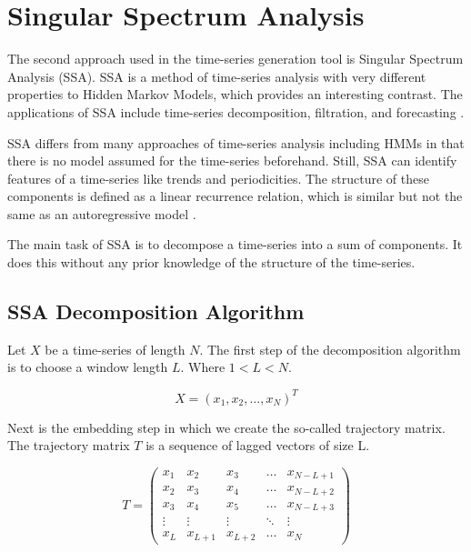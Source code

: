 
\chapter{Singular Spectrum Analysis}\label{chapter:ssa}

The second approach used in the time-series generation tool is Singular Spectrum Analysis (SSA). SSA is a method of time-series analysis with very different properties to Hidden Markov Models, which provides an interesting contrast. The applications of SSA include time-series decomposition, filtration, and forecasting \parencite{golyandina2013singular}.

SSA differs from many approaches of time-series analysis including HMMs in that there is no model assumed for the time-series beforehand. Still, SSA can identify features of a time-series like trends and periodicities. The structure of these components is defined as a linear recurrence relation, which is similar but not the same as an autoregressive model \parencite{golyandina2014basic}.

The main task of SSA is to decompose a time-series into a sum of components. It does this without any prior knowledge of the structure of the time-series. 

\section{SSA Decomposition Algorithm}

Let $X$ be a time-series of length $N$. The first step of the decomposition algorithm is to choose a window length $L$. Where $1 < L < N$. 

\begin{equation}
   X = (x_1, x_2, \ldots ,x_N)^T
\end{equation}

Next is the embedding step in which we create the so-called trajectory matrix. The trajectory matrix $T$ is a sequence of lagged vectors of size L. 

\begin{equation}
   T = 
\left(\begin{array}{ccccc}
x_{1} & x_{2} & x_{3} & \dots & x_{N-L+1} \\
x_{2} & x_{3} & x_{4} & \dots & x_{N-L+2} \\
x_{3} & x_{4} & x_{5} & \dots & x_{N-L+3} \\
\vdots & \vdots & \vdots & \ddots & \vdots \\
x_{L} & x_{L+1} & x_{L+2} & \dots & x_{N}
\end{array}\right)
   \label{eq:ssa-trajectory}
\end{equation}

